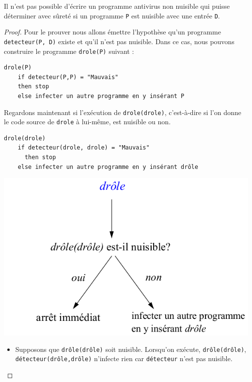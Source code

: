 \begin{mytheo}
	Il n'est pas possible d'écrire un programme antivirus non nuisible
	qui puisse déterminer avec sûreté
	si un programme \lstinline|P| est nuisible avec une entrée \lstinline|D|.
\end{mytheo}
\begin{proof}
	Pour le prouver nous allons émettre l'hypothèse qu'un programme \lstinline|detecteur(P, D)| existe et qu'il n'est pas nuisible. Dans ce cas, nous pouvons construire le programme \lstinline|drole(P)| suivant :

	\label{lst:detecteur_de_virus}
	\begin{lstlisting}
drole(P)
    if detecteur(P,P) = "Mauvais"
    then stop
    else infecter un autre programme en y insérant P
\end{lstlisting}

	Regardons maintenant si l'exécution de \lstinline|drole(drole)|, c'est-à-dire si l'on donne le code source de \lstinline|drole| à lui-même, est nuisible ou non.
	\begin{lstlisting}
drole(drole)
    if detecteur(drole, drole) = "Mauvais"
	  then stop
    else infecter un autre programme en y insérant drôle
\end{lstlisting}

	\begin{center}
		\includegraphics[scale=0.5]{Images/drole_de_drole.png}
	\end{center}

\begin{itemize}
	\item Supposons que \lstinline|drôle(drôle)| soit nuisible.
      Lorsqu'on exécute, \lstinline|drôle(drôle)|,
      \lstinline|détecteur(drôle,drôle)| n'infecte rien car \lstinline|détecteur| n'est pas nuisible.


\end{itemize}
\end{proof}
